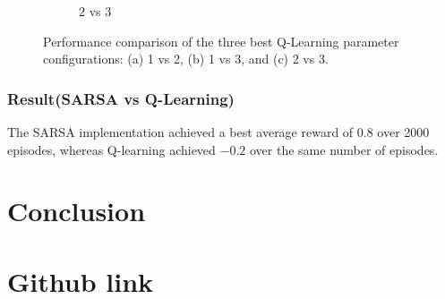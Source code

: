 \documentclass[11pt, a4]{article}
\begin{document}
\begin{figure}[H]
\begin{subfigure}{.7\textwidth}
						\caption{$2$ vs $3$}
						\label{fig:qlearningminigridworld2vs3}
					\end{subfigure}
					\caption{Performance comparison of the three best Q-Learning parameter configurations: (a) 1 vs 2, (b) 1 vs 3, and (c) 2 vs 3.}
					\label{fig:qlearningminigridworld}
				\end{figure}
			\subsubsection{Result(SARSA vs Q-Learning)}
			The SARSA implementation achieved a best average reward of \(0.8\) over 2000 episodes, whereas Q-learning achieved \(-0.2\) over the same number of episodes.
	\section{Conclusion}
	\section{Github link}	
		 \href{https://github.com/RitabrataMandal/RL-DA6400-assignment_1}{}

		
		
\end{document}
